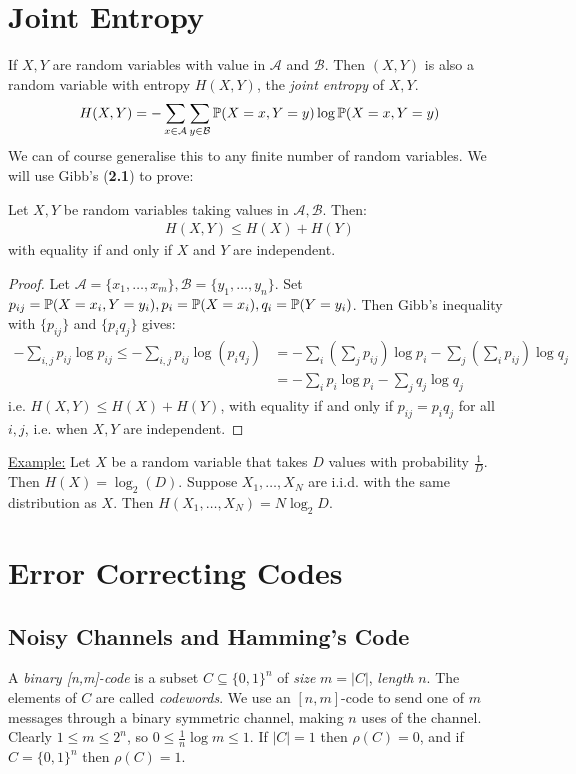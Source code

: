 \documentclass[10pt,a4paper]{article}
\begin{document}
\section{Joint Entropy}
If $X,Y$ are random variables with value in $\mathcal{A}$ and $\mathcal{B}$. Then $(X,Y)$ is also a random variable with entropy $H(X,Y)$, the \emph{joint entropy} of $X,Y$.
\begin{align*}
H(X,Y) = -\sum_{x \in \mathcal{A}} \sum_{y \in \mathcal{B}} \P(X=x, Y=y)\log \P(X=x, Y=y)
\end{align*}
We can of course generalise this to any finite number of random variables. We will use Gibb's (\textbf{2.1}) to prove:
\begin{lemma}
Let $X,Y$ be random variables taking values in $\mathcal{A}, \mathcal{B}$. Then:\begin{align*}
H(X,Y) \leq H(X) + H(Y)
\end{align*}
with equality if and only if $X$ and $Y$ are independent.
\end{lemma}
\begin{proof}
Let $\mathcal{A} = \{x_1, \ldots, x_m\}, \mathcal{B} = \{y_1, \ldots, y_n\}$. Set $p_{ij} = \P(X=x_i, Y=y_i), p_i = \P(X=x_i), q_i = \P(Y=y_i)$. Then Gibb's inequality with $\{p_{ij}\}$ and $\{p_iq_j\}$ gives:
\begin{align*}
-\sum_{i,j} p_{ij}\log p_{ij} \leq -\sum_{i,j} p_{ij}\log(p_iq_j) &= -\sum_i\left(\sum_j p_{ij}\right) \log p_i - \sum_j \left(\sum_i p_{ij}\right) \log q_j\\
&= -\sum_i p_i \log p_i -\sum_j q_j \log q_j
\end{align*}
i.e. $H(X,Y) \leq H(X) + H(Y)$, with equality if and only if $p_{ij} = p_i q_j$ for all $i, j$, i.e. when $X,Y$ are independent.
\end{proof}

\hspace*{-1em}\underline{Example:} Let $X$ be a random variable that takes $D$ values with probability $\frac1D$. Then $H(X) = \log_2(D)$. Suppose $X_1, \ldots, X_N$ are i.i.d. with the same distribution as $X$. Then $H(X_1, \ldots, X_N) = N \log_2 D$.

\section{Error Correcting Codes}
\subsection{Noisy Channels and Hamming's Code}
A \emph{binary [n,m]-code} is a subset $C \subseteq \{0,1\}^n$ of \emph{size} $m = |C|$, \emph{length} $n$. The elements of $C$ are called \emph{codewords}. We use an $[n,m]$-code to send one of $m$ messages through a binary symmetric channel, making $n$ uses of the channel. Clearly $1 \leq m \leq 2^n$, so $0\leq \frac{1}{n}\log m \leq 1$. If $|C| = 1$ then $\rho(C) = 0$, and if $C= \{0,1\}^n$ then $\rho(C) = 1$.
\end{document}
